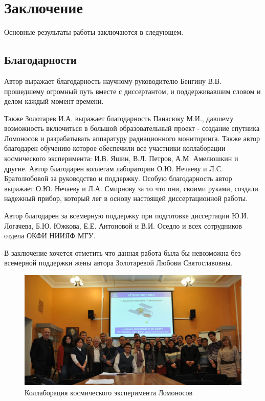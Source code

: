 \chapter*{Заключение}						%


Основные результаты работы заключаются в следующем.

\section{Благодарности}
Автор выражает благодарность научному руководителю Бенгину В.В. прошедшему огромный путь вместе с диссертантом, и поддерживавшим словом и делом каждый момент времени. 

Также Золотарев И.А. выражает благодарность Панасюку М.И., давшему возможность включиться в большой образовательный проект - создание спутника Ломоносов и разрабатывать аппаратуру радиационного мониторинга. Также автор благодарен обучению которое обеспечили  все участники коллаборации космического эксперимента:  И.В. Яшин,  В.Л. Петров,  А.М. Амелюшкин и другие.  Автор благодарен коллегам  лаборатории  О.Ю. Нечаеву и  Л.С. Братолюбовой за руководство и поддержку. Особую благодарность автор выражает  О.Ю. Нечаеву и  Л.А. Смирнову за то что они,  своими руками, создали надежный прибор, который лег в основу настоящей диссертационной работы.

Автор благодарен за всемерную поддержку при подготовке диссертации  Ю.И. Логачева,  Б.Ю. Южкова, Е.Е. Антоновой и  В.И. Оседло и всех сотрудников отдела ОКФИ НИИЯФ МГУ.  

В заключение хочется отметить что данная работа была бы невозможна без всемерной поддержки жены автора Золотаревой Любови Святославовны.

\begin{figure}
	\centering
	\includegraphics[width=0.7\linewidth]{images/collab}
	\caption{Коллаборация космического эксперимента Ломоносов}
	\label{fig:collab}
\end{figure}
